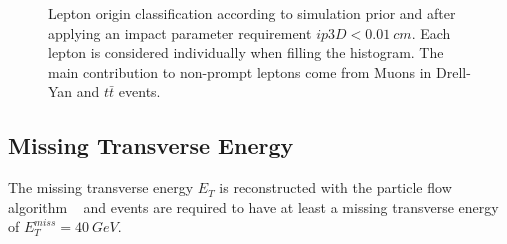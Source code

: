 \begin{figure}[tph]
  \centering
  \vfil
  \caption{Lepton origin classification according to simulation prior and after applying
    an impact parameter requirement $ip3D<0.01~cm$. Each lepton is considered individually
    when filling the histogram. The main contribution to non-prompt leptons come
    from Muons in Drell-Yan and $t\bar{t}$ events.
  }
  \label{fig:HFakeString}
\end{figure}


\subsection{Missing Transverse Energy}

The missing transverse energy $E_T$ is reconstructed with the particle flow
algorithm ~\cite{particleflow} and events are required to have at least a
missing transverse energy of $E_T^{miss}=40~GeV$.

